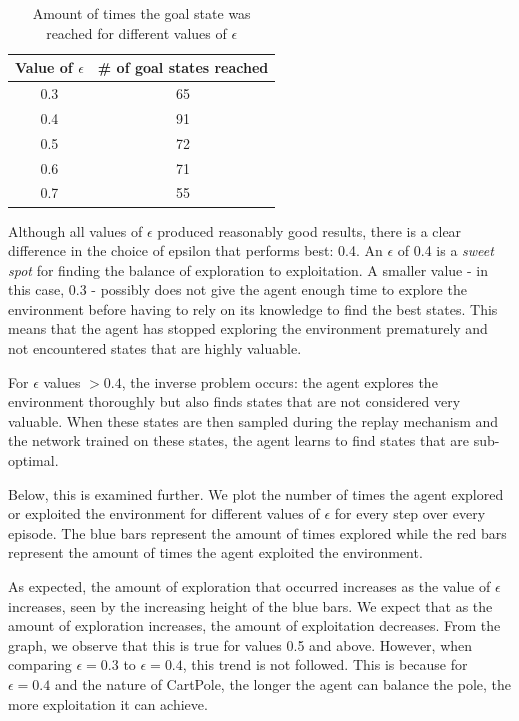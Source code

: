 \documentclass{article}
\begin{document}
\begin{table}[H]
    \centering
    \begin{tabular}{|c|c|}
    \hline
    Value of $\epsilon$ & \# of goal states reached \\
    \hline
    0.3 & 65 \\
    0.4 & 91 \\
    0.5 & 72 \\ 
    0.6 & 71 \\
    0.7 & 55 \\
    \hline
    \end{tabular}
    \caption{Amount of times the goal state was reached for different values of $\epsilon$}
    \label{tab:eps_vs_succ}
\end{table}




Although all values of $\epsilon$ produced reasonably good results, there is a clear difference in the choice of epsilon that performs best: 0.4. An $\epsilon$ of 0.4 is a \textit{sweet spot} for finding the balance of exploration to exploitation. A smaller value - in this case, 0.3 - possibly does not give the agent enough time to explore the environment before having to rely on its knowledge to find the best states. This means that the agent has stopped exploring the environment prematurely and not encountered states that are highly valuable. 

For $\epsilon$ values $> 0.4$, the inverse problem occurs: the agent explores the environment thoroughly but also finds states that are not considered very valuable. When these states are then sampled during the replay mechanism and the network trained on these states, the agent learns to find states that are sub-optimal.

Below, this is examined further. We plot the number of times the agent explored or exploited the environment for different values of $\epsilon$ for every step over every episode. The blue bars represent the amount of times explored while the red bars represent the amount of times the agent exploited the environment. 

As expected, the amount of exploration that occurred increases as the value of $\epsilon$ increases, seen by the increasing height of the blue bars. We expect that as the amount of exploration increases, the amount of exploitation decreases. From the graph, we observe that this is true for values 0.5 and above. However, when comparing $\epsilon = 0.3$ to $\epsilon = 0.4$, this trend is not followed. This is because for $\epsilon = 0.4$ and the nature of CartPole, the longer the agent can balance the pole, the more exploitation it can achieve.
\end{document}
